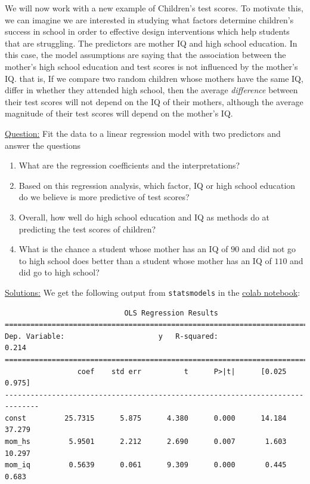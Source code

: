 \begin{example}
We will now work with a new example of Children's test scores. To motivate this, we can imagine we are interested in studying what factors determine children's success in school in order to effective design interventions which help students that are struggling. The predictors are mother IQ and high school education.  
 In this case, the model assumptions are saying that the association between the mother's high school education and test scores is not influenced by the mother's IQ. that is, If we compare two random children whose mothers have the same IQ, differ in whether they attended high school, then the average \emph{difference} between their test scores will not depend on the IQ of their mothers, although the average magnitude of their test scores will depend on the mother's IQ. 


\noindent
\underline{Question:} Fit the data to a linear regression model with two predictors and answer the questions
\begin{enumerate}[label=(\alph*)]
\item What are the regression coefficients and the interpretations? 
\item Based on this regression analysis, which factor, IQ or high school education do we believe is more predictive of test scores? 
\item Overall, how well do high school education and IQ as methods do at predicting the test scores of children? 
\item What is the chance a student whose mother has an IQ of $90$ and did not go to high school does better than a student whose mother has an IQ of $110$ and did go to high school?\\
\end{enumerate}



\noindent
\underline{Solutions:}
We get the following output from \verb!statsmodels! in the \href{https://colab.research.google.com/drive/1oIRgP_7-c5DGV1D2iz5nj406mZfJxUIG?usp=sharing}{colab notebook}:\\

\noindent
\begin{Verbatim}
                            OLS Regression Results                            
==============================================================================
Dep. Variable:                      y   R-squared:                       0.214                                   
==============================================================================
                 coef    std err          t      P>|t|      [0.025      0.975]
------------------------------------------------------------------------------
const         25.7315      5.875      4.380      0.000      14.184      37.279
mom_hs         5.9501      2.212      2.690      0.007       1.603      10.297
mom_iq         0.5639      0.061      9.309      0.000       0.445       0.683



\end{Verbatim}
\end{example}
